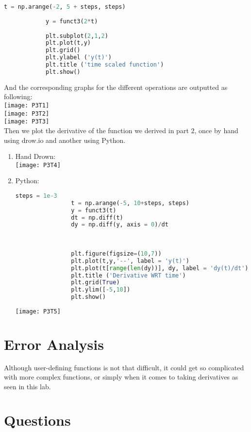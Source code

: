 \documentclass[11pt,a4]{Lab2 Report}
\begin{document}
\begin{itemize}
\begin{lstlisting}[language=Python]
			t = np.arange(-2, 5 + steps, steps)
			
			y = funct3(2*t)
			
			plt.subplot(2,1,2)
			plt.plot(t,y)
			plt.grid()
			plt.ylabel ('y(t)')
			plt.title ('time scaled function')
			plt.show()
		\end{lstlisting}
		
		And the corresponding graphs for the different operations are outputted as following:\\
		\texttt{[image: P3T1]}\\
		\texttt{[image: P3T2]}\\
		\texttt{[image: P3T3]}\\
		Then we plot the derivative of the function we derived in part 2, once by hand using drow.io and another using Python.
		\begin{enumerate}
			\item 
			Hand Drown:\\
			\texttt{[image: P3T4]}
			\item
			Python:\\
			\begin{lstlisting}[language=Python]
				steps = 1e-3
				t = np.arange(-5, 10+steps, steps)
				y = funct3(t)
				dt = np.diff(t)
				dy = np.diff(y, axis = 0)/dt
				
				
				
				plt.figure(figsize=(10,7))
				plt.plot(t,y,'--', label = 'y(t)')
				plt.plot(t[range(len(dy))], dy, label = 'dy(t)/dt')
				plt.title ('Derivative WRT time')
				plt.grid(True)
				plt.ylim([-5,10])
				plt.show()
			\end{lstlisting}
			\texttt{[image: P3T5]}
		\end{enumerate}
		
	\end{itemize}

	\section{Error Analysis}
	
	Although user-defining functions is not that difficult, it could get so complicated with more complex functions, or simply when it comes to taking derivatives as seen in this lab.
	
	\section{Questions}
	
\end{document}
